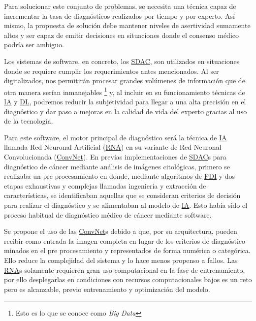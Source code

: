 Para solucionar este conjunto de problemas, se necesita una técnica capaz de
incrementar la tasa de diagnósticos realizados por tiempo y por experto. Así
mismo, la propuesta de solución debe mantener niveles de asertividad sumamente
altos y ser capaz de emitir decisiones en situaciones donde el consenso médico
podría ser ambiguo.~\cite{Meza-Palacios2017}

Los sistemas de software, en concreto, los \hyperlink{abbr}{SDAC}, son
utilizados en situaciones donde se requiere cumplir los requerimientos antes
mencionados. Al ser digitalizados, nos permitirán procesar grandes volúmenes de
información que de otra manera serían inmanejables \footnote{Esto es lo que se
conoce como \emph{Big Data}} y, al incluir en su funcionamiento técnicas de
\hyperlink{abbr}{IA} y \hyperlink{abbr}{DL}, podremos reducir la subjetividad
para llegar a una alta precisión en el diagnóstico y dar paso a mejoras en la
calidad de vida del experto gracias al uso de la
tecnología.~\cite{DominguezHernandez2013} 

Para este software, el motor principal de diagnóstico será la técnica de
\hyperlink{abbr}{IA} llamada Red Neuronal Artificial
(\hyperlink{abbr}{RNA}) en su
variante de Red Neuronal Convolucionada
(\hyperlink{abbr}{ConvNet}).
En previas implementaciones de \hyperlink{abbr}{SDAC}s para diagnóstico de
cáncer mediante análisis de imágenes citológicas, primero se realizaba un pre
procesamiento en donde, mediante algoritmos de \hyperlink{abbr}{PDI} y dos
etapas exhaustivas y complejas llamadas ingeniería y extracción de
características, se identificaban aquellas que se consideran criterios de
decisión para realizar el diagnóstico y se alimentaban al modelo de
\hyperlink{abbr}{IA}. Esto había sido el proceso habitual de diagnóstico médico
de cáncer mediante software.~\cite{Ashok2016} 

Se propone el uso de las \hyperlink{abbr}{ConvNet}s debido a que, por su
arquitectura, pueden recibir como entrada la imagen completa en lugar de los
criterios de diagnóstico minados en el pre procesamiento y representados de
forma numérica o categórica. Ello reduce la complejidad del sistema y lo hace
menos propenso a fallos. Las \hyperlink{abbr}{RNA}s solamente requieren gran uso
computacional en la fase de entrenamiento, por ello desplegarlas en condiciones
con recursos computacionales bajos es un reto pero es alcanzable, previo
entrenamiento y optimización del modelo.~\cite{Lee2017} 

